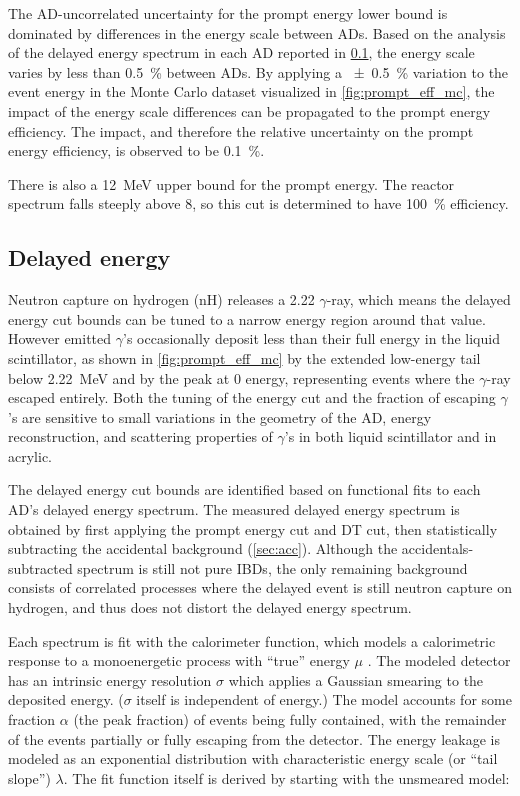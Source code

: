 The AD-uncorrelated uncertainty for the prompt energy lower bound
is dominated by differences in the energy scale between ADs.
Based on the analysis of the delayed energy spectrum in each AD
reported in \cref{subsec:delayed}, the energy scale
varies by less than \SI{0.5}{\percent} between ADs.
By applying a \SI{+-0.5}{\percent} variation to
the event energy in the Monte Carlo dataset visualized in \cref{fig:prompt_eff_mc},
the impact of the energy scale differences can be propagated
to the prompt energy efficiency.
The impact, and therefore the relative uncertainty on
the prompt energy efficiency, is observed to be \SI{0.1}{\percent}.


There is also a \SI{12}{\mega\electronvolt} upper bound for the prompt energy.
The reactor \nuebar{} spectrum falls steeply above \SI{8}{\mev},
so this cut is determined to have \SI{100}{\percent} efficiency.

\subsection{Delayed energy}
\label{subsec:delayed}

Neutron capture on hydrogen (nH) releases a
\SI{2.22}{\mev} $\gamma$-ray,
which means the delayed energy cut bounds can be tuned to a narrow energy region
around that value.
However emitted $\gamma$'s occasionally
deposit less than their full energy in the liquid scintillator,
as shown in \cref{fig:prompt_eff_mc} by the extended low-energy tail
below \SI{2.22}{\MeV} and by the peak at \num{0} energy,
representing events where the $\gamma$-ray escaped entirely.
Both the tuning of the energy cut
and the fraction of escaping $\gamma$'s are sensitive to
small variations in the geometry of the AD, energy reconstruction,
and scattering properties of $\gamma$'s in
both liquid scintillator and in acrylic.

The delayed energy cut bounds are identified based on
functional fits to each AD's delayed energy spectrum.
The measured delayed energy spectrum is obtained by first applying
the prompt energy cut and DT cut,
then statistically subtracting the accidental background (\cref{sec:acc}).
Although the accidentals-subtracted spectrum is still not pure IBDs,
the only remaining background consists of correlated processes
where the delayed event is still
neutron capture on hydrogen, and thus does not distort
the delayed energy spectrum.

Each spectrum is fit with the calorimeter function, which models
a calorimetric response to a monoenergetic process with ``true''
energy $\mu$ \cite{calorimeter2016}.
The modeled detector has an intrinsic energy resolution $\sigma$
which applies a Gaussian smearing to the deposited energy.
($\sigma$ itself is independent of energy.)
The model accounts for some fraction $\alpha$ (the peak fraction)
of events being fully contained,
with the remainder of the events partially or fully escaping from the detector.
The energy leakage is modeled as an exponential distribution
with characteristic energy scale (or ``tail slope'') $\lambda$.
The fit function itself is derived by starting with
the unsmeared model:

